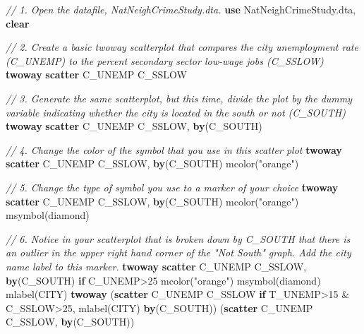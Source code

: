 \documentclass[
]{book}
\newenvironment{Shaded}{\begin{snugshade}}{\end{snugshade}}
\newcommand{\BaseNTok}[1]{\textcolor[rgb]{0.00,0.00,0.81}{#1}}
\newcommand{\CommentTok}[1]{\textcolor[rgb]{0.56,0.35,0.01}{\textit{#1}}}
\newcommand{\KeywordTok}[1]{\textcolor[rgb]{0.13,0.29,0.53}{\textbf{#1}}}
\newcommand{\NormalTok}[1]{#1}
\newcommand{\StringTok}[1]{\textcolor[rgb]{0.31,0.60,0.02}{#1}}
\begin{document}
\begin{alert}

\begin{Shaded}
\begin{Highlighting}[]
\CommentTok{// 1. Open the datafile, \textasciigrave{}NatNeighCrimeStudy.dta\textasciigrave{}.}
\KeywordTok{use}\NormalTok{ NatNeighCrimeStudy.dta, }\KeywordTok{clear}

\CommentTok{// 2.  Create a basic twoway scatterplot that compares the city unemployment rate (\textasciigrave{}C\_UNEMP\textasciigrave{}) to the percent secondary sector low{-}wage jobs (\textasciigrave{}C\_SSLOW\textasciigrave{})}
\KeywordTok{twoway} \KeywordTok{scatter}\NormalTok{ C\_UNEMP C\_SSLOW}

\CommentTok{// 3. Generate the same scatterplot, but this time, divide the plot by the dummy variable indicating whether the city is located in the south or not (\textasciigrave{}C\_SOUTH\textasciigrave{})}
\KeywordTok{twoway} \KeywordTok{scatter}\NormalTok{ C\_UNEMP C\_SSLOW, }\KeywordTok{by}\NormalTok{(C\_SOUTH)}

\CommentTok{// 4.  Change the color of the symbol that you use in this scatter plot}
\KeywordTok{twoway} \KeywordTok{scatter}\NormalTok{ C\_UNEMP C\_SSLOW, }\KeywordTok{by}\NormalTok{(C\_SOUTH) mcolor(}\StringTok{"orange"}\NormalTok{)}

\CommentTok{// 5.  Change the type of symbol you use to a marker of your choice}
\KeywordTok{twoway} \KeywordTok{scatter}\NormalTok{ C\_UNEMP C\_SSLOW, }\KeywordTok{by}\NormalTok{(C\_SOUTH) mcolor(}\StringTok{"orange"}\NormalTok{) }\BaseNTok{msymbol}\NormalTok{(diamond)}

\CommentTok{// 6.  Notice in your scatterplot that is broken down by \textasciigrave{}C\_SOUTH\textasciigrave{} that there is an outlier in the upper right hand corner of the "Not South" graph. Add the city name label to this marker.}
\KeywordTok{twoway} \KeywordTok{scatter}\NormalTok{ C\_UNEMP C\_SSLOW, }\KeywordTok{by}\NormalTok{(C\_SOUTH) }\KeywordTok{if}\NormalTok{ C\_UNEMP\textgreater{}25 mcolor(}\StringTok{"orange"}\NormalTok{) }\BaseNTok{msymbol}\NormalTok{(diamond) }\BaseNTok{mlabel}\NormalTok{(CITY)}
\KeywordTok{twoway}\NormalTok{ (}\KeywordTok{scatter}\NormalTok{ C\_UNEMP C\_SSLOW }\KeywordTok{if}\NormalTok{ T\_UNEMP\textgreater{}15 \& C\_SSLOW\textgreater{}25, }\BaseNTok{mlabel}\NormalTok{(CITY) }\KeywordTok{by}\NormalTok{(C\_SOUTH)) (}\KeywordTok{scatter}\NormalTok{ C\_UNEMP C\_SSLOW, }\KeywordTok{by}\NormalTok{(C\_SOUTH))}
\end{Highlighting}
\end{Shaded}

\end{alert}
\end{document}
